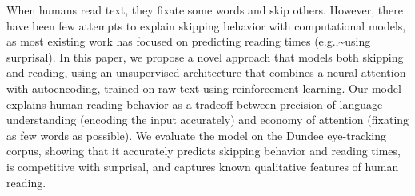 When humans read text, they fixate some words and skip others. However, there have been few attempts to explain skipping behavior with computational models, as most existing work has focused on predicting reading times (e.g.,{\textasciitilde}using surprisal). In this paper, we propose a novel approach that models both skipping and reading, using an unsupervised architecture that combines a neural attention with autoencoding, trained on raw text using reinforcement learning. Our model explains human reading behavior as a tradeoff between precision of language understanding (encoding the input accurately) and economy of attention (fixating as few words as possible). We evaluate the model on the Dundee eye-tracking corpus, showing that it accurately predicts skipping behavior and reading times, is competitive with surprisal, and captures known qualitative features of human reading.
